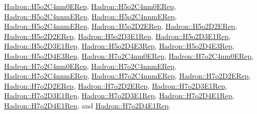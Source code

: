 \mbox{\hyperlink{structHadron_1_1H5o2C4nm0ERep}{Hadron\+::\+H5o2\+C4nm0\+E\+Rep}}, \mbox{\hyperlink{structHadron_1_1H5o2C4nm0ERep}{Hadron\+::\+H5o2\+C4nm0\+E\+Rep}}, \mbox{\hyperlink{structHadron_1_1H5o2C4nnmERep}{Hadron\+::\+H5o2\+C4nnm\+E\+Rep}}, \mbox{\hyperlink{structHadron_1_1H5o2C4nnmERep}{Hadron\+::\+H5o2\+C4nnm\+E\+Rep}}, \mbox{\hyperlink{structHadron_1_1H5o2C4nnmERep}{Hadron\+::\+H5o2\+C4nnm\+E\+Rep}}, \mbox{\hyperlink{structHadron_1_1H5o2D2ERep}{Hadron\+::\+H5o2\+D2\+E\+Rep}}, \mbox{\hyperlink{structHadron_1_1H5o2D2ERep}{Hadron\+::\+H5o2\+D2\+E\+Rep}}, \mbox{\hyperlink{structHadron_1_1H5o2D2ERep}{Hadron\+::\+H5o2\+D2\+E\+Rep}}, \mbox{\hyperlink{structHadron_1_1H5o2D3E1Rep}{Hadron\+::\+H5o2\+D3\+E1\+Rep}}, \mbox{\hyperlink{structHadron_1_1H5o2D3E1Rep}{Hadron\+::\+H5o2\+D3\+E1\+Rep}}, \mbox{\hyperlink{structHadron_1_1H5o2D3E1Rep}{Hadron\+::\+H5o2\+D3\+E1\+Rep}}, \mbox{\hyperlink{structHadron_1_1H5o2D4E3Rep}{Hadron\+::\+H5o2\+D4\+E3\+Rep}}, \mbox{\hyperlink{structHadron_1_1H5o2D4E3Rep}{Hadron\+::\+H5o2\+D4\+E3\+Rep}}, \mbox{\hyperlink{structHadron_1_1H5o2D4E3Rep}{Hadron\+::\+H5o2\+D4\+E3\+Rep}}, \mbox{\hyperlink{structHadron_1_1H7o2C4nm0ERep}{Hadron\+::\+H7o2\+C4nm0\+E\+Rep}}, \mbox{\hyperlink{structHadron_1_1H7o2C4nm0ERep}{Hadron\+::\+H7o2\+C4nm0\+E\+Rep}}, \mbox{\hyperlink{structHadron_1_1H7o2C4nm0ERep}{Hadron\+::\+H7o2\+C4nm0\+E\+Rep}}, \mbox{\hyperlink{structHadron_1_1H7o2C4nnmERep}{Hadron\+::\+H7o2\+C4nnm\+E\+Rep}}, \mbox{\hyperlink{structHadron_1_1H7o2C4nnmERep}{Hadron\+::\+H7o2\+C4nnm\+E\+Rep}}, \mbox{\hyperlink{structHadron_1_1H7o2C4nnmERep}{Hadron\+::\+H7o2\+C4nnm\+E\+Rep}}, \mbox{\hyperlink{structHadron_1_1H7o2D2ERep}{Hadron\+::\+H7o2\+D2\+E\+Rep}}, \mbox{\hyperlink{structHadron_1_1H7o2D2ERep}{Hadron\+::\+H7o2\+D2\+E\+Rep}}, \mbox{\hyperlink{structHadron_1_1H7o2D2ERep}{Hadron\+::\+H7o2\+D2\+E\+Rep}}, \mbox{\hyperlink{structHadron_1_1H7o2D3E1Rep}{Hadron\+::\+H7o2\+D3\+E1\+Rep}}, \mbox{\hyperlink{structHadron_1_1H7o2D3E1Rep}{Hadron\+::\+H7o2\+D3\+E1\+Rep}}, \mbox{\hyperlink{structHadron_1_1H7o2D3E1Rep}{Hadron\+::\+H7o2\+D3\+E1\+Rep}}, \mbox{\hyperlink{structHadron_1_1H7o2D4E1Rep}{Hadron\+::\+H7o2\+D4\+E1\+Rep}}, \mbox{\hyperlink{structHadron_1_1H7o2D4E1Rep}{Hadron\+::\+H7o2\+D4\+E1\+Rep}}, and \mbox{\hyperlink{structHadron_1_1H7o2D4E1Rep}{Hadron\+::\+H7o2\+D4\+E1\+Rep}}.



